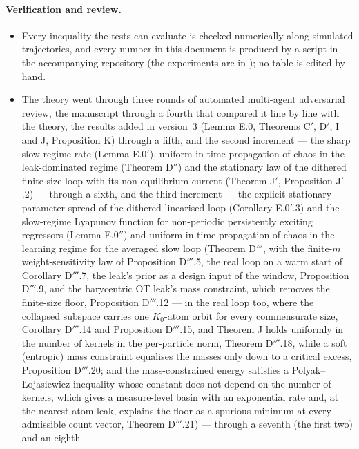 \paragraph{Verification and review.}
\begin{itemize}
  \item Every inequality the tests can evaluate is checked numerically along simulated trajectories, and every number
    in this document is produced by a script in the accompanying repository (the experiments are in
    ); no table is edited by hand.
  \item The theory went through three rounds of automated multi-agent adversarial review, the manuscript through a
    fourth that compared it line by line with the theory, the results added in version~3 (Lemma E.0, Theorems
    C$'$, D$'$, I and J, Proposition K) through a fifth, and the second increment --- the sharp slow-regime rate
    (Lemma E.0$'$), uniform-in-time propagation of chaos in the leak-dominated regime (Theorem D$''$) and the
    stationary law of the dithered finite-size loop with its non-equilibrium current (Theorem J$'$,
    Proposition J$'$.2) --- through a sixth, and the third increment --- the explicit stationary parameter spread of
    the dithered linearised loop (Corollary E.0$'$.3) and the slow-regime Lyapunov function for non-periodic
    persistently exciting regressors (Lemma E.0$''$) and uniform-in-time propagation of chaos in the learning
    regime for the averaged slow loop (Theorem D$'''$, with the finite-$m$ weight-sensitivity law of
    Proposition D$'''$.5, the real loop on a warm start of Corollary D$'''$.7, the leak's prior as a design input of
    the window, Proposition D$'''$.9, and the barycentric OT leak's mass constraint, which removes the finite-size
    floor, Proposition D$'''$.12 --- in the real loop too, where the collapsed subspace carries one $K_0$-atom orbit
    for every commensurate size, Corollary D$'''$.14 and Proposition D$'''$.15, and Theorem J holds uniformly in the
    number of kernels in the per-particle norm, Theorem D$'''$.18, while a soft (entropic) mass constraint equalises
    the masses only down to a critical excess, Proposition D$'''$.20; and the mass-constrained energy satisfies a
    Polyak--{\L}ojasiewicz inequality whose constant does not depend on the number of kernels, which gives a
    measure-level basin with an exponential rate and, at the nearest-atom leak, explains the floor as a spurious
    minimum at every admissible count vector, Theorem D$'''$.21) --- through a seventh (the first two) and an eighth

\end{itemize}

